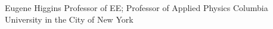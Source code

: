 %
{Eugene Higgins Professor of EE; Professor of Applied Physics}%
{Columbia University in the City of New York}%
{\quad{}}